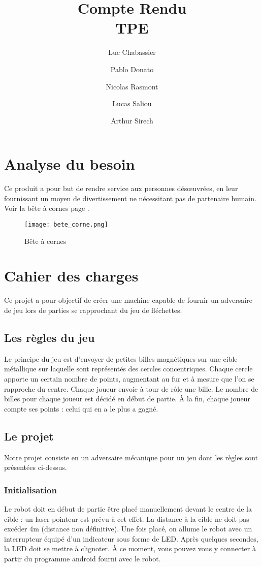 \documentclass{article}
\title{Compte Rendu\\TPE}
\author{Luc Chabassier \and Pablo Donato \and Nicolas Rasmont \and Lucas Saliou \and Arthur Sirech}
\begin{document}
\maketitle
\tableofcontents

\section{Analyse du besoin}
Ce produit a pour but de rendre service aux personnes désœuvrées, en leur fournissant un moyen de divertissement ne nécessitant pas de partenaire humain. Voir la bête à cornes page \pageref{bete_cornes}.
\begin{figure}
	\begin{center}
		\texttt{[image: bete\_corne.png]}
	\end{center}
	\caption{Bête à cornes}
	\label{bete_cornes}
\end{figure}

\section{Cahier des charges}
Ce projet a pour objectif de créer une machine capable de fournir un adversaire de jeu lors de parties se rapprochant du jeu de fléchettes.

\subsection{Les règles du jeu}
Le principe du jeu est d'envoyer de petites billes magnétiques sur une cible métallique sur laquelle sont représentés des cercles concentriques. Chaque cercle apporte un certain nombre de points, augmentant au fur et à mesure que l'on se rapproche du centre. Chaque joueur envoie à tour de rôle une bille. Le nombre de billes pour chaque joueur est décidé en début de partie. À la fin, chaque joueur compte ses points : celui qui en a le plus a gagné.

\subsection{Le projet}
Notre projet consiste en un adversaire mécanique pour un jeu dont les règles sont présentées ci-dessus.

\subsubsection{Initialisation}
Le robot doit en début de partie être placé manuellement devant le centre de la cible : un laser pointeur est prévu à cet effet. La distance à la cible ne doit pas excéder 4m (distance non définitive). Une fois placé, on allume le robot avec un interrupteur équipé d'un indicateur sous forme de LED. Après quelques secondes, la LED doit se mettre à clignoter. À ce moment, vous pouvez vous y connecter à partir du programme android fourni avec le robot.
\end{document}
